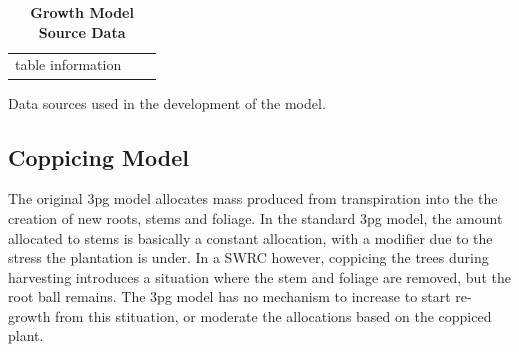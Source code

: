 \documentclass[10pt]{article}
\begin{document}
\begin{table}[!ht]
\caption{
\textbf{Growth Model Source Data}}
\begin{tabular}{|c|c|c|}
table information
\end{tabular}
\begin{flushleft}Data sources used in the development of the model.
\end{flushleft}
\label{tab:data}
 \end{table}

\subsection*{Coppicing Model}
\label{sec:coppicing-model}
The original \ac{3pg} model allocates mass produced from transpiration
into the the creation of new roots, stems and foliage.  In the
standard \ac{3pg} model, the amount allocated to stems is basically a
constant allocation, with a modifier due to the stress the plantation
is under.  In a \ac{SWRC} however, coppicing the trees during
harvesting introduces a situation where the stem and foliage are
removed, but the root ball remains.  The \ac{3pg} model has no
mechanism to increase to start re-growth from this stituation, or
moderate the allocations based on the coppiced plant.
\end{document}
